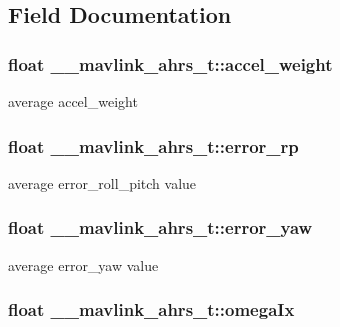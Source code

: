 \subsection{Field Documentation}
\hypertarget{struct____mavlink__ahrs__t_af784e223fbbd06a561b04fb564e3a493}{
\subsubsection[{accel\+\_\+weight}]{\setlength{\rightskip}{0pt plus 5cm}float \+\_\+\+\_\+mavlink\+\_\+ahrs\+\_\+t\+::accel\+\_\+weight}}\label{struct____mavlink__ahrs__t_af784e223fbbd06a561b04fb564e3a493}


average accel\+\_\+weight 

\hypertarget{struct____mavlink__ahrs__t_a5c6e55772a74e80eb2e036c1f283e128}{
\subsubsection[{error\+\_\+rp}]{\setlength{\rightskip}{0pt plus 5cm}float \+\_\+\+\_\+mavlink\+\_\+ahrs\+\_\+t\+::error\+\_\+rp}}\label{struct____mavlink__ahrs__t_a5c6e55772a74e80eb2e036c1f283e128}


average error\+\_\+roll\+\_\+pitch value 

\hypertarget{struct____mavlink__ahrs__t_ab100e9758e39284cdcac30757826ae4f}{
\subsubsection[{error\+\_\+yaw}]{\setlength{\rightskip}{0pt plus 5cm}float \+\_\+\+\_\+mavlink\+\_\+ahrs\+\_\+t\+::error\+\_\+yaw}}\label{struct____mavlink__ahrs__t_ab100e9758e39284cdcac30757826ae4f}


average error\+\_\+yaw value 

\hypertarget{struct____mavlink__ahrs__t_a799a878adcd1837bb8bcb5ce0af37311}{
\subsubsection[{omega\+Ix}]{\setlength{\rightskip}{0pt plus 5cm}float \+\_\+\+\_\+mavlink\+\_\+ahrs\+\_\+t\+::omega\+Ix}}\label{struct____mavlink__ahrs__t_a799a878adcd1837bb8bcb5ce0af37311}


